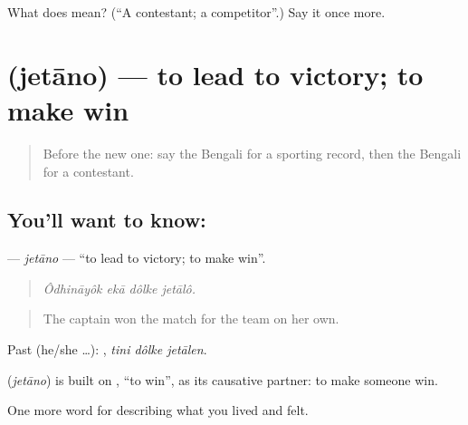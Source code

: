 \begin{tcolorbox}[breakable,colback=teal!4,colframe=teal!35!black,title={Before you move on}]
What does  mean? (\textquotedblleft{}A contestant; a competitor\textquotedblright{}.) Say it once more.
\end{tcolorbox}
\section[\texorpdfstring{\bn{জেতানো} (jetāno)}{জেতানো (jetāno)}]{ (jetāno) — to lead to victory; to make win}

\label{lesson:BN-C520-jetano}



\begin{quote}
Before the new one: say the Bengali for a sporting record, then the Bengali for a contestant.
\end{quote}

\subsection*{You'll want to know: }
\textbf{} — \emph{jetāno} — \textquotedblleft{}to lead to victory; to make win\textquotedblright{}.

\begin{quote}
   
\end{quote}

\begin{quote}
\emph{Ôdhināyôk ekā dôlke jetālô.}
\end{quote}

\begin{quote}
The captain won the match for the team on her own.
\end{quote}

Past (he/she …):   , \emph{tini dôlke jetālen}.

\begin{cousinweb}
\textbf{} (\emph{jetāno}) is built on , \textquotedblleft{}to win\textquotedblright{}, as its causative partner: to make someone win.
\end{cousinweb}

\begin{grammarlens}[title={What you've built}]
One more word for describing what you lived and felt.
\end{grammarlens}

